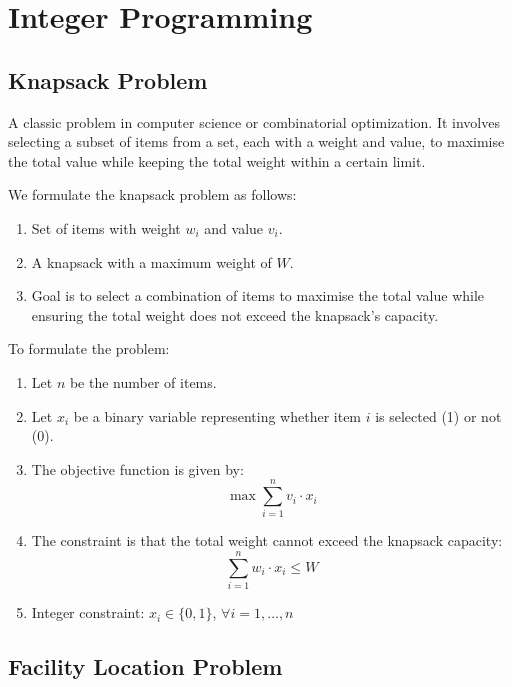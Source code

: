 \documentclass{article}
\begin{document}
\section{Integer Programming}

\subsection{Knapsack Problem}

A classic problem in computer science or combinatorial optimization. It involves selecting a subset of items from a set, each with a weight and value, to maximise the total value while keeping the total weight within a certain limit. 

\begin{definition}
    We formulate the knapsack problem as follows: 
    \begin{enumerate}
        \item Set of items with weight $w_i$ and value $v_i$. 
        \item A knapsack with a maximum weight of $W$. 
        \item Goal is to select a combination of items to maximise the total value while ensuring the total weight does not exceed the knapsack's capacity. 
    \end{enumerate}
    To formulate the problem: \begin{enumerate}
        \item Let $n$ be the number of items. 
        \item Let $x_i$ be a binary variable representing whether item $i$ is selected (1) or not (0). 
        \item The objective function is given by: \begin{equation*}
            \max \sum_{i=1}^{n} v_i \cdot x_i 
        \end{equation*}
        \item The constraint is that the total weight cannot exceed the knapsack capacity: \begin{equation*}
            \sum_{i=1}^{n} w_i \cdot x_i \leq W
        \end{equation*}
        \item Integer constraint: $x_i \in \{0, 1\}$, $\forall i = 1, \dots , n$
    \end{enumerate}
\end{definition}

\subsection{Facility Location Problem}
\end{document}
